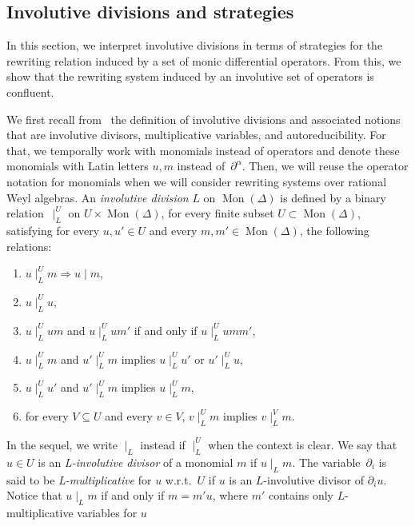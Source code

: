 \documentclass[11pt]{article}
\theoremstyle{definition}
\DeclareMathOperator{\Mon}{Mon}
\newcommand\divInv[1]{\mid_{#1}}
\begin{document}
\subsection{Involutive divisions and strategies}
\label{sec:involutive_divisions_and_strategies}

In this section, we interpret involutive divisions in terms of strategies
for the rewriting relation induced by a set of monic differential
operators. From this, we show that the rewriting system induced by an
involutive set of operators is confluent.
\medskip

We first recall from~\cite{MR1627129} the definition of involutive
divisions and associated notions that are involutive divisors,
multiplicative variables, and autoreducibility. For that, we temporally
work with monomials instead of operators and denote these monomials with
Latin letters $u,m$ instead of~$\partial^\alpha$. Then, we will reuse the
operator notation for monomials when we will consider rewriting systems
over rational Weyl algebras. An {\em involutive division} $L$ on
$\Mon(\Delta)$ is defined by a binary relation~$\divInv{L}^U$ on
$U\times\Mon(\Delta)$, for every finite subset $U\subset\Mon(\Delta)$,
satisfying for every $u,u'\in U$ and every $m,m'\in\Mon(\Delta)$, the
following relations:
\begin{enumerate}[label=\alph*)]
\item\label{it:div} $u\divInv{L}^Um\Rightarrow u\mid m$,
\item\label{it:unit} $u\divInv{L}^Uu$,
\item\label{it:mul} $u\divInv{L}^Uum$ and $u\divInv{L}^Uum'$ if and only
  if $u\divInv{L}^Uumm'$,
\item\label{it:vertex} $u\divInv{L}^Um$ and $u'\divInv{L}^Um$ implies
  $u\divInv{L}^Uu'$ or $u'\divInv{L}^Uu$,
\item\label{it:transitivity} $u\divInv{L}^Uu'$ and $u'\divInv{L}^Um$
  implies $u\divInv{L}^Um$,
\item\label{it:filter} for every $V\subseteq U$ and every $v\in V$,
  $v\divInv{L}^Um$ implies $v\divInv{L}^Vm$. 
\end{enumerate}
In the sequel, we write $\divInv{L}$ instead if $\divInv{L}^U$ when the
context is clear. We say that $u\in U$ is an {\em L-involutive divisor}
of a monomial $m$ if $u\divInv{L}m$. The variable~$\partial_i$ is said to be
{\em L-multiplicative} for $u$ w.r.t.\ $U$ if $u$ is an $L$-involutive
divisor of $\partial_iu$. Notice that $u\divInv{L}m$ if and only if
$m=m'u$, where $m'$ contains only $L$-multiplicative variables for $u$
\end{document}

